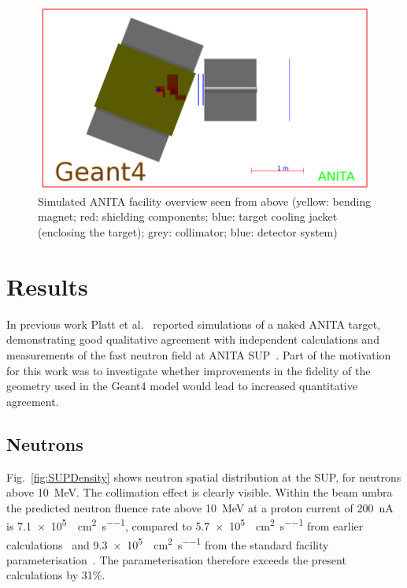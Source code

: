\documentclass[11pt,a4paper]{IEEEtran}
\let\MYoriglatexcaption\caption
\renewcommand{\caption}[2][\relax]{\MYoriglatexcaption[#2]{#2}}
\begin{document}
\begin{figure}[t]
	\centering
	\includegraphics[width=\columnwidth]{overview.png}
	\caption{
        Simulated ANITA facility overview seen from above (yellow: bending magnet; red: shielding components; blue: target cooling jacket (enclosing the target); grey: collimator; blue: detector system)
    }
	\label{fig:ANITAoverview}
\end{figure}

\section{Results}
In previous work Platt et al.~\cite{Platt13} reported simulations of a naked ANITA target, demonstrating good qualitative agreement with independent calculations and measurements of the fast neutron field at ANITA SUP~\cite{Prokofiev2009}.
Part of the motivation for this work was to investigate whether improvements in the fidelity of the geometry used in the Geant4 model would lead to increased quantitative agreement.

\subsection{Neutrons}
Fig.~\ref{fig:SUPDensity} shows neutron spatial distribution at the SUP, for neutrons above \SI{10}{\MeV}.
The collimation effect is clearly visible.
Within the beam umbra the predicted neutron fluence rate above \SI{10}{\MeV} at a proton current of \SI{200}{\nA} is \SI{7.1e5}{\neutron\per\cm\squared\per\second}, compared to \SI{5.7e5}{\neutron\per\cm\squared\per\second} from earlier calculations~\cite{Platt13} and \SI{9.3e5}{\neutron\per\cm\squared\per\second} from the standard facility parameterisation~\cite{Prokofiev2009}.
The parameterisation therefore exceeds the present calculations by 31\%.
\end{document}
